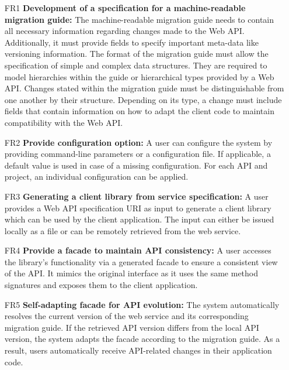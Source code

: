 \begin{itemize}[itemindent=-4pt, leftmargin=34pt, align=left]
    \item [FR1\hphantom{1}]  \textbf{Development of a specification for a machine-readable migration guide:} The machine-readable migration guide needs to contain all necessary information regarding changes made to the Web API. Additionally, it must provide fields to specify important meta-data like versioning information. The format of the migration guide must allow the specification of simple and complex data structures. They are required to model hierarchies within the guide or hierarchical types provided by a Web API. Changes stated within the migration guide must be distinguishable from one another by their structure. Depending on its type, a change must include fields that contain information on how to adapt the client code to maintain compatibility with the Web API.
    \item [FR2\hphantom{1}]  \textbf{Provide configuration option:} A user can configure the system by providing command-line parameters or a configuration file. If applicable, a default value is used in case of a missing configuration. For each API and project, an individual configuration can be applied.
    \item [FR3\hphantom{1}]  \textbf{Generating a client library from service specification:} A user provides a Web API specification URI as input to generate a client library which can be used by the client application. The input can either be issued locally as a file or can be remotely retrieved from the web service.
    \item [FR4\hphantom{1}]  \textbf{Provide a facade to maintain API consistency:} A user accesses the library's functionality via a generated facade to ensure a consistent view of the API. It mimics the original interface as it uses the same method signatures and exposes them to the client application.
     \item [FR5\hphantom{1}] 
     \textbf{Self-adapting facade for API evolution:} The system automatically resolves the current version of the web service and its corresponding migration guide. If the retrieved API version differs from the local API version, the system adapts the facade according to the migration guide. As a result, users automatically receive API-related changes in their application code.

\end{itemize}
